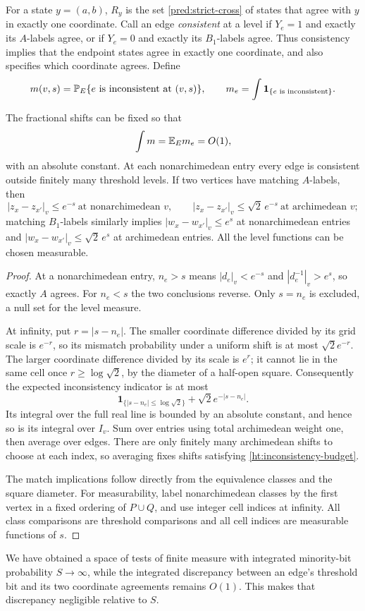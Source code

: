 For a state $y=(a,b)$, $R_y$ is the set
\eqref{pred:strict-cross} of states that agree with $y$ in exactly one
coordinate.
Call an edge \emph{consistent} at a level if $Y_e=1$ and exactly its
$A$-labels agree, or if $Y_e=0$ and exactly its $B_1$-labels agree.
Thus consistency implies that the endpoint states agree in exactly one coordinate,
and also specifies which coordinate agrees. Define
\begin{equation}\label{ht:inconsistency}
 m(v,s)=\mathbb P_E\{e\text{ is inconsistent at }(v,s)\},\qquad
 m_e=\int\mathbf1_{\{e\text{ is inconsistent}\}}.
\end{equation}

\begin{lemma}\label{ht:states}
The fractional shifts can be fixed so that
\begin{equation}\label{ht:inconsistency-budget}
 \int m=\mathbb E_E m_e=O(1),
\end{equation}
with an absolute constant. At each nonarchimedean entry every edge is
consistent outside finitely many threshold levels. If two vertices
have matching $A$-labels, then
\[
 |z_x-z_{x'}|_v\le e^{-s}\ \text{at nonarchimedean } v,\qquad
 |z_x-z_{x'}|_v\le\sqrt2\,e^{-s}\ \text{at archimedean } v;
\]
matching $B_1$-labels similarly implies
$|w_x-w_{x'}|_v\le e^s$ at nonarchimedean entries and
$|w_x-w_{x'}|_v\le\sqrt2\,e^s$ at archimedean entries.
All the level functions can be chosen measurable.
\end{lemma}

\begin{proof}
At a nonarchimedean entry, $n_e>s$ means
$|d_e|_v<e^{-s}$ and $|d_e^{-1}|_v>e^s$, so exactly $A$ agrees.
For $n_e<s$ the two conclusions reverse. Only $s=n_e$ is excluded,
a null set for the level measure.

At infinity, put $r=|s-n_e|$. The smaller coordinate difference divided by
its grid scale is $e^{-r}$, so its mismatch probability under a uniform
shift is at most $\sqrt2e^{-r}$. The larger coordinate difference divided by its scale
is $e^r$; it cannot lie in the same cell once $r\ge\log\sqrt2$,
by the diameter of a half-open square. Consequently the expected
inconsistency indicator is at most
\[
 \mathbf1_{\{|s-n_e|\le\log\sqrt2\}}+
                       \sqrt2e^{-|s-n_e|}.
\]
Its integral over the full real line is bounded by an absolute constant,
and hence so is its integral over $I_v$. Sum over entries using total
archimedean weight one, then average over edges. There are only finitely
many archimedean shifts to choose at each index, so averaging fixes
shifts satisfying \eqref{ht:inconsistency-budget}.

The match implications follow directly from the equivalence classes and
the square diameter. For measurability, label nonarchimedean classes by
the first vertex in a fixed ordering of $P\cup Q$, and use integer cell
indices at infinity. All class comparisons are threshold comparisons
and all cell indices are measurable functions of $s$.
\end{proof}

We have obtained a space of tests of finite measure with integrated minority-bit
probability $S\to\infty$, while the integrated discrepancy between an edge's
threshold bit and its two coordinate agreements remains $O(1)$.
This makes that discrepancy negligible relative to $S$.
